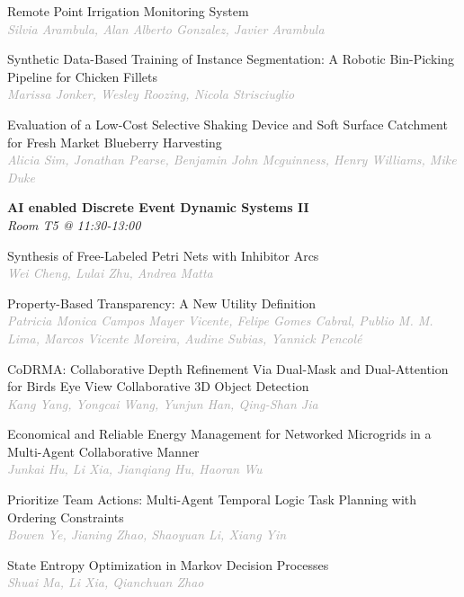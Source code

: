 \begin{multicols*}{2}
\small Remote Point Irrigation Monitoring System\\ 
\footnotesize \textcolor{darkgray}{\textit{Silvia Arambula, Alan Alberto  Gonzalez, Javier  Arambula}}

\small Synthetic Data-Based Training of Instance Segmentation: A Robotic Bin-Picking Pipeline for Chicken Fillets\\ 
\footnotesize \textcolor{darkgray}{\textit{Marissa Jonker, Wesley  Roozing, Nicola  Strisciuglio}}

\small Evaluation of a Low-Cost Selective Shaking Device and Soft Surface Catchment for Fresh Market Blueberry Harvesting\\ 
\footnotesize \textcolor{darkgray}{\textit{Alicia Sim, Jonathan  Pearse, Benjamin John  Mcguinness, Henry  Williams, Mike  Duke}}

\normalsize \textbf{AI enabled Discrete Event Dynamic Systems II}\\
\small \textit{Room T5 @ 11:30-13:00}

\small Synthesis of Free-Labeled Petri Nets with Inhibitor Arcs\\ 
\footnotesize \textcolor{darkgray}{\textit{Wei Cheng, Lulai  Zhu, Andrea  Matta}}

\small Property-Based Transparency: A New Utility Definition\\ 
\footnotesize \textcolor{darkgray}{\textit{Patricia Monica Campos Mayer Vicente, Felipe Gomes  Cabral, Publio M. M.  Lima, Marcos Vicente  Moreira, Audine  Subias, Yannick  Pencolé}}

\small CoDRMA: Collaborative Depth Refinement Via Dual-Mask and Dual-Attention for Birds Eye View Collaborative 3D Object Detection\\ 
\footnotesize \textcolor{darkgray}{\textit{Kang Yang, Yongcai  Wang, Yunjun  Han, Qing-Shan  Jia}}

\small Economical and Reliable Energy Management for Networked Microgrids in a Multi-Agent Collaborative Manner\\ 
\footnotesize \textcolor{darkgray}{\textit{Junkai Hu, Li  Xia, Jianqiang  Hu, Haoran  Wu}}

\small Prioritize Team Actions: Multi-Agent Temporal Logic Task Planning with Ordering Constraints\\ 
\footnotesize \textcolor{darkgray}{\textit{Bowen Ye, Jianing  Zhao, Shaoyuan  Li, Xiang  Yin}}

\small State Entropy Optimization in Markov Decision Processes\\ 
\footnotesize \textcolor{darkgray}{\textit{Shuai Ma, Li  Xia, Qianchuan  Zhao}}


\end{multicols*}
